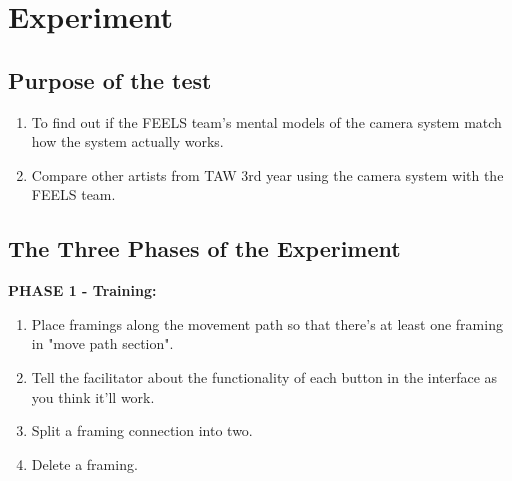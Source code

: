\section{Experiment}



\subsection{Purpose of the test}
\begin{enumerate}
\item To find out if the FEELS team’s mental models of the camera system match how the system actually works.
\item Compare other artists from TAW 3rd year using the camera system with the FEELS team.
\end{enumerate}





\subsection{The Three Phases of the Experiment}
\textbf{PHASE 1 - Training:}
\begin{enumerate}
\item Place framings along the movement path so that there's at least one framing in "move path section".
\item Tell the facilitator about the functionality of each button in the interface as you think it'll work.
\item Split a framing connection into two.
\item Delete a framing.
\end{enumerate}

